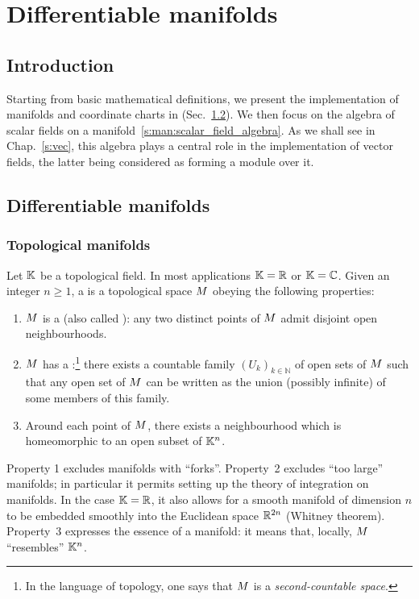 \chapter{Differentiable manifolds} \label{s:man}

\minitoc

\section{Introduction}

Starting from basic mathematical definitions, we present
the implementation of manifolds and coordinate charts in \Sage{}
(Sec.~\ref{s:bas:manif}).
We then focus on the algebra of scalar fields on a manifold~\eqref{s:man:scalar_field_algebra}.
As we shall see in Chap.~\ref{s:vec}, this algebra plays a central role in the implementation of vector fields, the latter being considered as forming a module
over it.

\section{Differentiable manifolds} \label{s:bas:manif}

\subsection{Topological manifolds} \label{s:bas:def_manif}

Let $\mathbb{K}$ be a topological field. In most applications $\mathbb{K}=\mathbb{R}$ or $\mathbb{K}=\mathbb{C}$.
Given an integer $n\geq 1$, a  is a topological space $M$ obeying the following properties:
\begin{enumerate}
\item $M$ is a  (also called ): any two distinct points of $M$
admit disjoint open neighbourhoods.
\item $M$ has a :\footnote{In the language of topology, one says that $M$ is a \emph{second-countable space}.}
there exists a countable family
$(U_k)_{k\in\mathbb{N}}$ of open sets of $M$ such that any open set of $M$ can be written as the union (possibly infinite) of some members of this family.
\item Around each point of $M$, there exists a neighbourhood which is
homeomorphic to an open subset of $\mathbb{K}^n$.
\end{enumerate}
Property 1 excludes manifolds with ``forks''.
Property~2 excludes ``too large'' manifolds; in particular it permits setting
up the theory of integration on manifolds. In the case $\mathbb{K}=\mathbb{R}$, it also
allows for a smooth manifold of dimension $n$ to be embedded smoothly into the Euclidean space $\mathbb{R}^{2n}$
(Whitney theorem).
Property~3 expresses the essence of a manifold: it means that, locally,
$M$ ``resembles'' $\mathbb{K}^n$.

